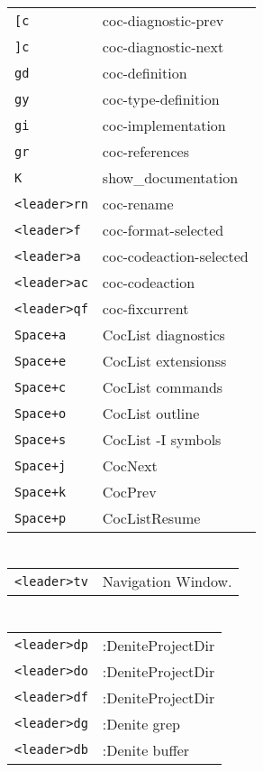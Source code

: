\begin{multicols}{3}
	\section{}
	\begin{tabular}{@{}ll@{}}
		\verb![c!         & coc-diagnostic-prev     \\
		\verb!]c!         & coc-diagnostic-next     \\
		\verb!gd!         & coc-definition          \\
		\verb!gy!         & coc-type-definition     \\
		\verb!gi!         & coc-implementation      \\
		\verb!gr!         & coc-references          \\
		\verb!K!          & show\_documentation     \\
		\verb!<leader>rn! & coc-rename              \\
		\verb!<leader>f ! & coc-format-selected     \\
		\verb!<leader>a ! & coc-codeaction-selected \\
		\verb!<leader>ac! & coc-codeaction          \\
		\verb!<leader>qf! & coc-fixcurrent          \\
		\verb!Space+a!    & CocList diagnostics     \\
		\verb!Space+e!    & CocList extensionss     \\
		\verb!Space+c!    & CocList commands        \\
		\verb!Space+o!    & CocList outline         \\
		\verb!Space+s!    & CocList -I symbols      \\
		\verb!Space+j!    & CocNext                 \\
		\verb!Space+k!    & CocPrev                 \\
		\verb!Space+p!    & CocListResume           \\
	\end{tabular}

	\section{}
	\begin{tabular}{@{}ll@{}}
		\verb!<leader>tv! & Navigation Window. \\
	\end{tabular}

	\section{}
	\begin{tabular}{@{}ll@{}}
		\verb!<leader>dp! & :DeniteProjectDir \\
		\verb!<leader>do! & :DeniteProjectDir \\
		\verb!<leader>df! & :DeniteProjectDir \\
		\verb!<leader>dg! & :Denite grep      \\
		\verb!<leader>db! & :Denite buffer    \\
	\end{tabular}


\end{multicols}
